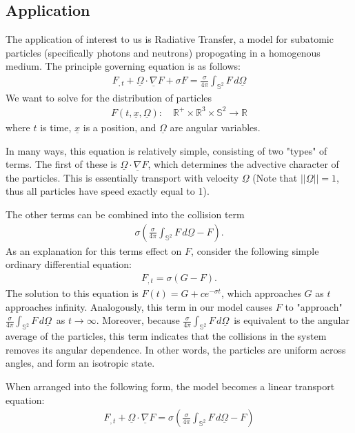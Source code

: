 \documentclass[12pt]{article}
\def \R {\mathbb{R}}
\newcommand{\bunderline}[1]{\underline{#1}}
\renewcommand{\vec}[1]{{\bunderline{#1}}}
\begin{document}
\subsection{Application}

The application of interest to us is Radiative Transfer, a model for subatomic particles (specifically photons and neutrons) propogating in a homogenous medium.
The principle governing equation is as follows:
\begin{align*}
	F_{,t} + \vec{\Omega} \cdot \vec{\nabla}F + \sigma F = \frac{\sigma}{4\pi}\int_{\mathbb{S}^2}F\,d\vec\Omega
\end{align*}
We want to solve for the distribution of particles
\begin{align*}
	F( t, \vec{x}, \vec{\Omega}) : \quad \R^+ \times \R^3 \times \mathbb{S}^2 \to \R
\end{align*}
where $t$ is time, $\vec{x}$ is a position, and $\vec{\Omega}$ are angular variables.

In many ways, this equation is relatively simple, consisting of two "types" of terms.
The first of these is $ \vec{\Omega} \cdot \vec{\nabla}F $, which determines the advective character of the particles.
This is essentially transport with velocity $\vec{\Omega}$ (Note that $||\vec{\Omega}|| = 1$, thus all particles have speed exactly equal to 1).

The other terms can be combined into the collision term 
\begin{align*}
	\sigma\left(\frac{\sigma}{4\pi}\int_{\mathbb{S}^2}F\,d\vec\Omega - F\right).
\end{align*}
As an explanation for this terms effect on $F$, consider the following simple ordinary differential equation:
\begin{align*}
	F_{,t} = \sigma( G - F ).
\end{align*}
The solution to this equation is $F(t) = G + ce^{-\sigma t}$, which approaches $G$ as $t$ approaches infinity.
Analogously, this term in our model causes $F$ to "approach" $\frac{\sigma}{4\pi}\int_{\mathbb{S}^2}F\,d\vec\Omega\,$ as $t\to \infty$.
Moreover, because $\frac{\sigma}{4\pi}\int_{\mathbb{S}^2}F\,d\vec\Omega\,$ is equivalent to the angular average of the particles, this term indicates that the collisions in the system removes its angular dependence.
In other words, the particles are uniform across angles, and form an isotropic state.

When arranged into the following form, the model becomes a linear transport equation:
\begin{align*}
	F_{,t} + \vec{\Omega} \cdot \vec{\nabla}F = \sigma \left(\frac{\sigma}{4\pi}\int_{\mathbb{S}^2}F\,d\vec\Omega - F\right)
\end{align*}
\end{document}
